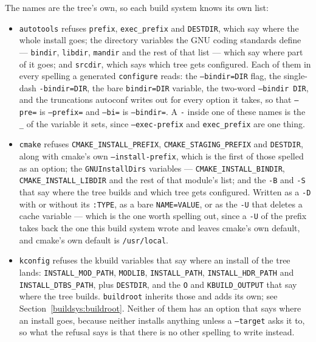 \documentclass{article}
\begin{document}
The names are the tree's own, so each build system knows its own list:

\begin{itemize}
\item \texttt{autotools} refuses \texttt{prefix},
  \texttt{exec\_prefix} and \texttt{DESTDIR}, which say where the
  whole install goes; the directory variables the GNU coding standards
  define --- \texttt{bindir}, \texttt{libdir}, \texttt{mandir} and the
  rest of that list --- which say where part of it goes; and
  \texttt{srcdir}, which says which tree gets configured.  Each of
  them in every spelling a generated \texttt{configure} reads: the
  \texttt{--bindir=DIR} flag, the single-dash \texttt{-bindir=DIR},
  the bare \texttt{bindir=DIR} variable, the two-word \texttt{--bindir
  DIR}, and the truncations autoconf writes out for every option it
  takes, so that \texttt{--pre=} is \texttt{--prefix=} and
  \texttt{--bi=} is \texttt{--bindir=}.  A \texttt{-} inside one of
  these names is the \texttt{\_} of the variable it sets, since
  \texttt{--exec-prefix} and \texttt{exec\_prefix} are one thing.

\item \texttt{cmake} refuses \texttt{CMAKE\_INSTALL\_PREFIX},
  \texttt{CMAKE\_STAGING\_PREFIX} and \texttt{DESTDIR}, along with
  cmake's own \texttt{--install-prefix}, which is the first of those
  spelled as an option; the \texttt{GNUInstallDirs} variables ---
  \texttt{CMAKE\_INSTALL\_BINDIR}, \texttt{CMAKE\_INSTALL\_LIBDIR}
  and the rest of that module's list; and the \texttt{-B} and
  \texttt{-S} that say where the tree builds and which tree gets
  configured.  Written as a \texttt{-D} with or without its
  \texttt{:TYPE}, as a bare \texttt{NAME=VALUE}, or as the \texttt{-U}
  that deletes a cache variable --- which is the one worth spelling
  out, since a \texttt{-U} of the prefix takes back the one this build
  system wrote and leaves cmake's own default, and cmake's own default
  is \texttt{/usr/local}.

\item \texttt{kconfig} refuses the kbuild variables that say where an
  install of the tree lands: \texttt{INSTALL\_MOD\_PATH},
  \texttt{MODLIB}, \texttt{INSTALL\_PATH}, \texttt{INSTALL\_HDR\_PATH}
  and \texttt{INSTALL\_DTBS\_PATH}, plus \texttt{DESTDIR}, and the
  \texttt{O} and \texttt{KBUILD\_OUTPUT} that say where the tree
  builds.  \texttt{buildroot} inherits those and adds its own; see
  Section~\ref{buildsys:buildroot}.  Neither of them has an option
  that says where an install goes, because neither installs anything
  unless a \texttt{--target} asks it to, so what the refusal says is
  that there is no other spelling to write instead.


\end{itemize}
\end{document}
